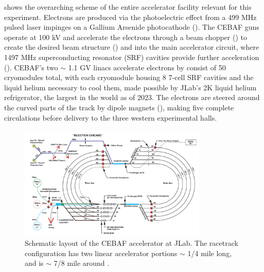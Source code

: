      shows the overarching scheme of the entire accelerator facility relevant for this experiment. Electrons are produced via the photoelectric effect from a 499 MHz pulsed laser impinges on a Gallium Arsenide photocathode (). The CEBAF guns operate at 100 kV and accelerate the electrons through a beam chopper () to create the desired beam structure () and into the main accelerator circuit, where 1497 MHz superconducting resonator (SRF) cavities provide further acceleration (). CEBAF's two $\sim$ 1.1 GV linacs accelerate electrons by consist of 50 cryomodules total, with each cryomodule housing 8 7-cell SRF cavities and the liquid helium necessary to cool them, made possible by JLab's 2K liquid helium refrigerator, the largest in the world as of 2023. The electrons are steered around the curved parts of the track by dipole magnets (), making five complete circulations before delivery to the three western experimental halls.
    
    
    \begin{figure}[ht]
        \centering
        \includegraphics[width=0.8\textwidth]{Chapters/Ch2-Experiment/accel_and_beamline/pics/CEBAF/jlab-accelerator-layout.png}
        \caption{Schematic layout of the CEBAF accelerator at JLab. The racetrack configuration has two linear accelerator portions $\sim$ 1/4 mile long, and is $\sim$ 7/8 mile around \parencite{Wang2010CEBAFOverview}.}
        \label{fig:jlab_accelerator_layout}
    \end{figure}
    
